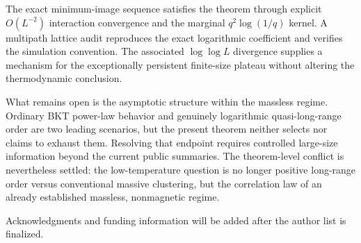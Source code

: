 \documentclass[aps,prb,twocolumn,groupedaddress,amsmath,amssymb,
               superscriptaddress,nofootinbib,floatfix]{revtex4-2}
\theoremstyle{plain}
\theoremstyle{definition}
\begin{document}
The exact minimum-image sequence satisfies the theorem through explicit
$O(L^{-2})$ interaction convergence and the marginal $q^2\log(1/q)$ kernel.
A multipath lattice audit reproduces the exact logarithmic coefficient and
verifies the simulation convention.  The associated $\log\log L$ divergence
supplies a mechanism for the exceptionally persistent finite-size plateau
without altering the thermodynamic conclusion.

What remains open is the asymptotic structure within the massless regime.
Ordinary BKT power-law behavior and genuinely logarithmic quasi-long-range
order are two leading scenarios, but the present theorem neither selects nor
claims to exhaust them.  Resolving that endpoint requires controlled
large-size information beyond the current public summaries.  The
theorem-level conflict is nevertheless settled: the low-temperature question
is no longer positive long-range order versus conventional massive
clustering, but the correlation law of an already established massless,
nonmagnetic regime.

\begin{acknowledgments}
Acknowledgments and funding information will be added after the author list
is finalized.
\end{acknowledgments}


\end{document}
